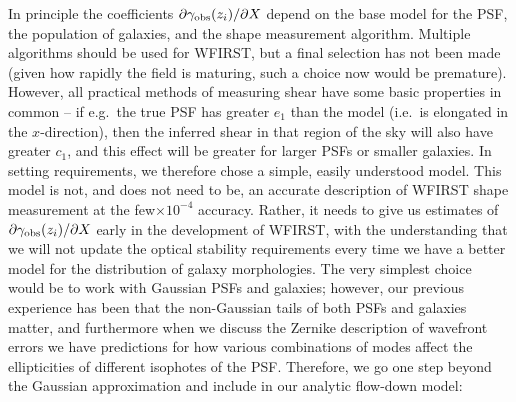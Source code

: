 \documentclass[usenatbib]{mnras}
\begin{document}
In principle the coefficients $\partial\gamma_{\rm obs}(z_i)/\partial X$ depend on the base model for the PSF, the population of galaxies, and the shape measurement algorithm. Multiple algorithms should be used for WFIRST, but a final selection has not been made (given how rapidly the field is maturing, such a choice now would be premature). However, all practical methods of measuring shear have some basic properties in common -- if e.g.\ the true PSF has greater $e_1$ than the model (i.e.\ is elongated in the $x$-direction), then the inferred shear in that region of the sky will also have greater $c_1$, and this effect will be greater for larger PSFs or smaller galaxies. In setting requirements, we therefore chose a simple, easily understood model. This model is not, and does not need to be, an accurate description of WFIRST shape measurement at the few$\times 10^{-4}$ accuracy. Rather, it needs to give us estimates of $\partial\gamma_{\rm obs}(z_i)/\partial X$ early in the development of WFIRST, with the understanding that we will not update the optical stability requirements every time we have a better model for the distribution of galaxy morphologies. The very simplest choice would be to work with Gaussian PSFs and galaxies; however, our previous experience has been that the non-Gaussian tails of both PSFs and galaxies matter, and furthermore when we discuss the Zernike description of wavefront errors we have predictions for how various combinations of modes affect the ellipticities of different isophotes of the PSF. Therefore, we go one step beyond the Gaussian approximation and include in our analytic flow-down model:
\end{document}

